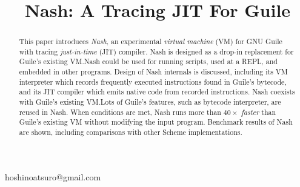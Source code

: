 \documentclass[preprint, 10pt]{sigplanconf}
\begin{document}
\setlength{\pdfpageheight}{\paperheight}
\setlength{\pdfpagewidth}{\paperwidth}





\title{Nash: A Tracing JIT For Guile}

           {}
           {hoshinoatsuro@gmail.com}

\maketitle

\begin{abstract}

This paper introduces \textit{Nash}, an experimental \textit{virtual machine}
(VM) for GNU Guile with tracing \textit{just-in-time} (JIT) compiler. Nash is
designed as a drop-in replacement for Guile's existing VM.\@ Nash could be
used for running scripts, used at a REPL, and embedded in other
programs. Design of Nash internals is discussed, including its VM interpreter
which records frequently executed instructions found in Guile's bytecode, and
its JIT compiler which emits native code from recorded instructions. Nash
coexists with Guile's existing VM.\@ Lots of Guile's features, such as
bytecode interpreter, are reused in Nash. When conditions are met, Nash runs
more than \textit{$40\times$ faster} than Guile's existing VM without
modifying the input program. Benchmark results of Nash are shown, including
comparisons with other Scheme implementations.

\end{abstract}


\end{document}
